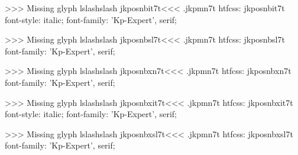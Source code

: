 >>>
Missing glyph	lslashslash
\<jkposnbit7t\><<<
.jkpmn7t
htfcss:  jkposnbit7t  font-style: italic; font-family: 'Kp-Expert', serif;

>>>
Missing glyph	lslashslash
\<jkposnbsl7t\><<<
.jkpmn7t
htfcss:  jkposnbsl7t  font-family: 'Kp-Expert', serif;

>>>
Missing glyph	lslashslash
\<jkposnbxn7t\><<<
.jkpmn7t
htfcss:  jkposnbxn7t  font-family: 'Kp-Expert', serif;

>>>
Missing glyph	lslashslash
\<jkposnbxit7t\><<<
.jkpmn7t
htfcss:  jkposnbxit7t  font-style: italic; font-family: 'Kp-Expert', serif;

>>>
Missing glyph	lslashslash
\<jkposnbxsl7t\><<<
.jkpmn7t
htfcss:  jkposnbxsl7t  font-family: 'Kp-Expert', serif;

